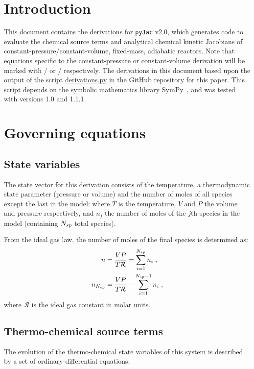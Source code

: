 \documentclass[12pt,number,sort&compress]{elsarticle}
\begin{document}
\section{Introduction}
This document contains the derivations for \texttt{pyJac} v2.0, which generates code to evaluate the chemical source terms and analytical chemical kinetic Jacobians of constant-pressure\slash constant-volume, fixed-mass, adiabatic reactors.
Note that equations specific to the constant-pressure or constant-volume derivation will be marked with \conp/ or \conv/ respectively.
The derivations in this document based upon the output of the script \href{https://github.com/arghdos/SPyJac-paper/blob/master/derivations/scripts/derivations.py}{derivations.py} in the GitHub repository for this paper.
This script depends on the symbolic mathematics library SymPy~\cite{sympy}, and was tested with versions 1.0 and 1.1.1

\section{Governing equations}
\subsection{State variables}
\label{s:state}
The state vector for this derivation consists of the temperature, a thermodynamic state parameter (pressure or volume) and the number of moles of all species except the last in the model:
where $T$ is the temperature, $V$ and $P$ the volume and pressure respectively, and $n_j$ the number of moles of the $j$th species in the model (containing $\ns/$ total species).

From the ideal gas law, the number of moles of the final species is determined as:
\begin{align}
\label{e:last_species}
n &= \frac{V P}{T \Ru/} = \sum_{i=1}^{\ns/}{n_i}\; , \nonumber \\
n_{\ns/} &= \frac{V P}{T \Ru/} - \sum_{i=1}^{\ns/ - 1}{n_i}\;,
\end{align}
where $\mathcal{R}$ is the ideal gas constant in molar units.

\subsection{Thermo-chemical source terms}
\label{s:source}
The evolution of the thermo-chemical state variables of this system is described by a set of ordinary-differential equations:
\end{document}
